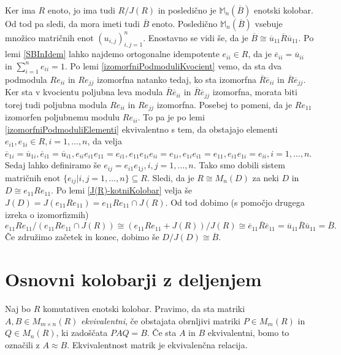 \documentclass[a4paper, 12pt]{amsart}
\theoremstyle{definition} %
\theoremstyle{plain} %
\newcommand{\M}{\mathbb M}
\begin{document}
\proof
Ker ima $R$ enoto, jo ima tudi $R/J(R)$ in posledično je $\M_n(\overline{B})$ enotski kolobar. Od tod pa sledi, da mora imeti tudi $\overline{B}$ enoto. Posledično $\M_n(\overline{B})$ vsebuje množico matričnih enot $(u_{i,j})_{i,j=1}^n$. Enostavno se vidi še, da je $\overline{B}\cong \overline{u}_{11}\overline{R} \overline{u}_{11} $. Po lemi \ref{SBInIdem} lahko najdemo ortogonalne idempotente $e_{ii} \in R$, da je $\overline{e}_{ii} = \overline{u}_{ii}$ in $\sum_{i=1}^n e_{ii} = 1$. Po lemi \ref{izomorfniPodmoduliKvocient} vemo, da sta dva podmodula $Re_{ii}$ in $Re_{jj}$ izomorfna natanko tedaj, ko sta izomorfna $\overline{R} \overline{e}_{ii}$ in $\overline{R}\overline{e}_{jj}$. Ker sta v kvocientu poljubna leva modula $\overline{R} \overline{e}_{ii}$ in $\overline{R}\overline{e}_{jj}$ izomorfna, morata biti torej tudi poljubna modula $Re_{ii}$ in $Re_{jj}$ izomorfna. Posebej to pomeni, da je $Re_{11}$ izomorfen poljubnemu modulu $Re_{ii}$. To pa je po lemi \ref{izomorfniPodmoduliElementi} ekvivalentno s tem, da obstajajo elementi $e_{i1}, e_{1i}\in R, i=1,\dots,n$, da velja $\overline{e}_{1i} = \overline{u}_{1i}, \overline{e}_{i1} = \overline{u}_{i1}, e_{ii}e_{i1}e_{11} = e_{i1}, e_{11} e_{1i}e_{ii} = e_{1i}, e_{1i} e_{i1} = e_{11}, e_{i1} e_{1i} = e_{ii}, i = 1,\dots,n$. Sedaj lahko definiramo še $e_{ij} = e_{i1}e_{1j}, i, j = 1,\dots,n$. Tako smo dobili sistem matričnih enot $\{ e_{ij}|i,j=1,\dots,n\} \subseteq R$. Sledi, da je $R\cong M_n(D)$ za neki $D$ in $D\cong e_{11} R e_{11}$. Po lemi \ref{J(R)-kotniKolobar} velja še $J(D) = J(e_{11} R e_{11}) = e_{11} R e_{11} \cap J(R)$. Od tod dobimo (s pomočjo drugega izreka o izomorfizmih)
$$
e_{11}Re_{11} / (e_{11} R e_{11} \cap J(R)) \cong (e_{11} R e_{11} + J(R))/J(R) \cong \overline{e}_{11} \overline{R} \overline{e}_{11} = \overline{u}_{11} \overline{R} \overline{u}_{11} = \overline{B}.
$$
Če združimo začetek in konec, dobimo še $D/J(D) \cong \overline{B}$.
\endproof

\section{Osnovni kolobarji z deljenjem}

Naj bo $R$ komutativen enotski kolobar. Pravimo, da sta matriki $A,B\in M_{m\times n} (R)$ \emph{ekvivalentni}, če obstajata obrnljivi matriki $P\in M_m(R)$ in $Q\in M_n(R)$, ki zadoščata $PAQ = B$. Če sta $A$ in $B$ ekvivalentni, bomo to označili z $A \approx B$. Ekvivalentnost matrik je ekvivalenčna relacija.
\end{document}
